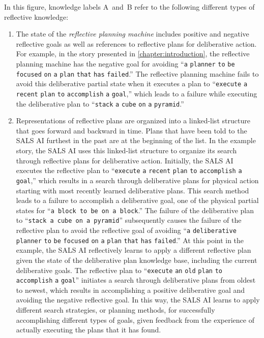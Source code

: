 In this figure, knowledge labels {\mbox{A~and~B}} refer to the
following different types of reflective knowledge:
\begin{enumerate}[~~A.]
\item The state of the {\emph{reflective planning machine}} includes
  positive and negative reflective goals as well as references to
  reflective plans for deliberative action.  For example, in the story
  presented in {\mbox{\autoref{chapter:introduction}}}, the reflective
  planning machine has the negative goal for avoiding ``{\tt{a}}
  {\tt{planner}} {\tt{to}} {\tt{be}} {\tt{focused}} {\tt{on}} {\tt{a}}
  {\tt{plan}} {\tt{that}} {\tt{has}} {\tt{failed}}.''  The reflective
  planning machine fails to avoid this deliberative partial state when
  it executes a plan to ``{\tt{execute}} {\tt{a}} {\tt{recent}}
  {\tt{plan}} {\tt{to}} {\tt{accomplish}} {\tt{a}} {\tt{goal}},''
  which leads to a failure while executing the deliberative plan to
  ``{\tt{stack}} {\tt{a}} {\tt{cube}} {\tt{on}} {\tt{a}}
  {\tt{pyramid}}.''
\item Representations of reflective plans are organized into a
  linked-list structure that goes forward and backward in time.  Plans
  that have been told to the SALS AI furthest in the past are at the
  beginning of the list.  In the example story, the SALS AI uses this
  linked-list structure to organize its search through reflective
  plans for deliberative action.  Initially, the SALS AI executes the
  reflective plan to ``{\tt{execute}} {\tt{a}} {\tt{recent}}
  {\tt{plan}} {\tt{to}} {\tt{accomplish}} {\tt{a}} {\tt{goal}},''
  which results in a search through deliberative plans for physical
  action starting with most recently learned deliberative plans.  This
  search method leads to a failure to accomplish a deliberative goal,
  one of the physical partial states for ``{\tt{a block to be on a
      block}}.''  The failure of the deliberative plan to ``{\tt{stack
      a cube on a pyramid}}'' subsequently causes the failure of the
  reflective plan to avoid the reflective goal of avoiding ``{\tt{a}}
  {\tt{deliberative}} {\tt{planner}} {\tt{to}} {\tt{be}}
  {\tt{focused}} {\tt{on}} {\tt{a}} {\tt{plan}} {\tt{that}} {\tt{has}}
  {\tt{failed}}.''  At this point in the example, the SALS AI
  reflectively learns to apply a different reflective plan given the
  state of the deliberative plan knowledge base, including the current
  deliberative goals.  The reflective plan to ``{\tt{execute}}
  {\tt{an}} {\tt{old}} {\tt{plan}} {\tt{to}} {\tt{accomplish}}
  {\tt{a}} {\tt{goal}}'' initiates a search through deliberative plans
  from oldest to newest, which results in accomplishing a positive
  deliberative goal and avoiding the negative reflective goal.  In
  this way, the SALS AI learns to apply different search strategies,
  or planning methods, for successfully accomplishing different types
  of goals, given feedback from the experience of actually executing
  the plans that it has found.
\end{enumerate}
